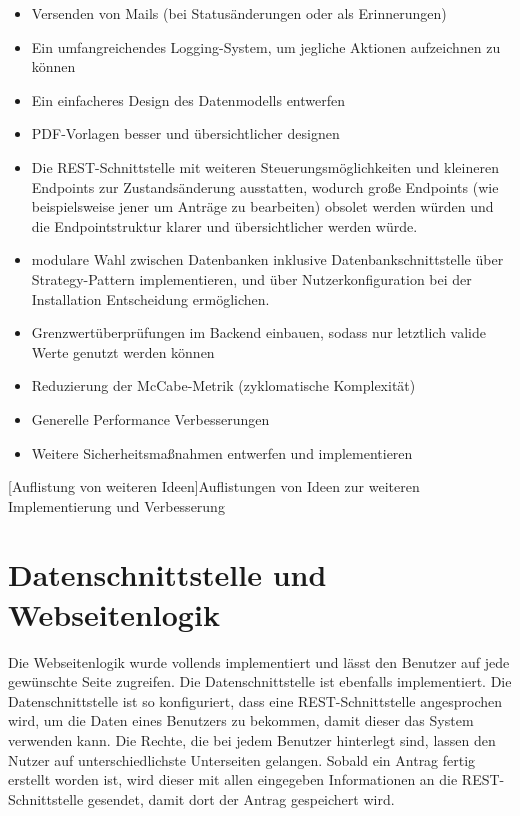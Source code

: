 \begin{itemize}
	\item Versenden von Mails (bei Statusänderungen oder als Erinnerungen)
	\item Ein umfangreichendes Logging-System, um jegliche Aktionen aufzeichnen zu können
	\item Ein einfacheres Design des Datenmodells entwerfen
	\item PDF-Vorlagen besser und übersichtlicher designen
	\item Die REST-Schnittstelle mit weiteren Steuerungsmöglichkeiten und kleineren Endpoints zur Zustandsänderung ausstatten, wodurch große Endpoints (wie beispielsweise jener um Anträge zu bearbeiten) obsolet werden würden und die Endpointstruktur klarer und übersichtlicher werden würde.
	\item modulare Wahl zwischen Datenbanken inklusive Datenbankschnittstelle über Strategy-Pattern implementieren, und über Nutzerkonfiguration bei der Installation Entscheidung ermöglichen.
	\item Grenzwertüberprüfungen im Backend einbauen, sodass nur letztlich valide Werte genutzt werden können
	\item Reduzierung der McCabe-Metrik (zyklomatische Komplexität)
	\item Generelle Performance Verbesserungen
	\item Weitere Sicherheitsmaßnahmen entwerfen und implementieren
\end{itemize}
[Auflistung von weiteren Ideen]{Auflistungen von Ideen zur weiteren Implementierung und Verbesserung}
\newpage
\section{Datenschnittstelle und Webseitenlogik}
Die Webseitenlogik wurde vollends implementiert und lässt den Benutzer auf jede gewünschte Seite zugreifen. Die Datenschnittstelle ist ebenfalls implementiert. Die Datenschnittstelle ist so konfiguriert, dass eine REST-Schnittstelle angesprochen wird, um die Daten eines Benutzers zu bekommen, damit dieser das System verwenden kann. Die Rechte, die bei jedem Benutzer hinterlegt sind, lassen den Nutzer auf unterschiedlichste Unterseiten gelangen. Sobald ein Antrag fertig erstellt worden ist, wird dieser mit allen eingegeben Informationen an die REST-Schnittstelle gesendet, damit dort der Antrag gespeichert wird.\\

